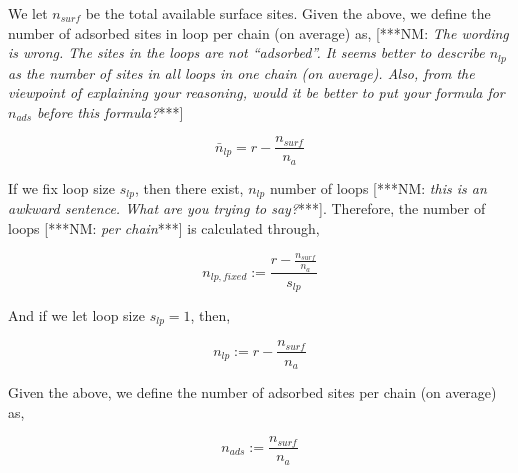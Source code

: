 \documentclass[10pt,letterpaper]{article}
\begin{document}
%


\noindent 
We let $n_{surf}$ be the total available surface sites. Given the above, we define the number of adsorbed sites in loop per chain (on average) as,
[***NM: \textit{The wording is wrong.  The sites in
the loops are not ``adsorbed''.  It seems better to 
describe $n_{lp}$ as the number of sites in all loops 
in one chain (on average).  Also, from the viewpoint
of explaining your reasoning, would it be better 
to put your formula for $n_{ads}$ before this
formula?}***]

\begin{equation}
	\boxed{\bar{n}_{lp}=r-\frac{n_{surf}}{n_a}}
	\label{mean nlp}
\end{equation}


\noindent If we fix loop size $s_{lp}$, then there exist, $n_{lp}$ number of loops  [***NM: 
\textit{this is an awkward sentence.  What are 
you trying to say?}***]. 
Therefore, the number of loops [***NM: \textit{per 
chain}***] is calculated through,


\begin{equation}
	\boxed{n_{lp,fixed}:= \frac{r-\frac{n_{surf}}{n_a}}{s_{lp}}}
	\label{nlp,Gen}
\end{equation}


\noindent And if we let loop size $s_{lp}=1$, then,


\begin{equation}
\boxed{n_{lp}:= r-\frac{n_{surf}}{n_a}}
\label{nlp}
\end{equation}

%






\noindent Given the above, we define the number of adsorbed sites per chain (on average) as,

\begin{equation}
	\boxed{n_{ads}:= \frac{n_{surf}}{n_a}}
	\label{nads}
\end{equation}
\end{document}
